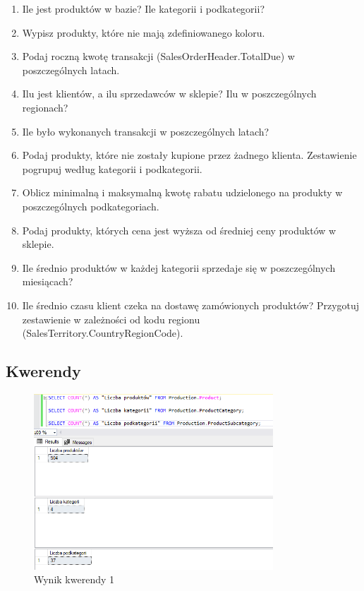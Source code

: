\documentclass[a4paper,12pt]{article}
\begin{document}
\begin{enumerate}
    \item Ile jest produktów w bazie? Ile kategorii i podkategorii?
    \item Wypisz produkty, które nie mają zdefiniowanego koloru.
    \item Podaj roczną kwotę transakcji (SalesOrderHeader.TotalDue) w poszczególnych latach.
    \item Ilu jest klientów, a ilu sprzedawców w sklepie? Ilu w poszczególnych regionach?
    \item Ile było wykonanych transakcji w poszczególnych latach?
    \item Podaj produkty, które nie zostały kupione przez żadnego klienta. Zestawienie pogrupuj według kategorii i podkategorii.
    \item Oblicz minimalną i maksymalną kwotę rabatu udzielonego na produkty w poszczególnych podkategoriach.
    \item Podaj produkty, których cena jest wyższa od średniej ceny produktów w sklepie.
    \item Ile średnio produktów w każdej kategorii sprzedaje się w poszczególnych miesiącach?
    \item Ile średnio czasu klient czeka na dostawę zamówionych produktów? Przygotuj zestawienie w zależności od kodu regionu (SalesTerritory.CountryRegionCode).
\end{enumerate}

\subsection{Kwerendy}

\begin{figure}[H]
    \centering
    \includegraphics[width=0.8\textwidth]{images/01.png}
    \caption{Wynik kwerendy 1}
    \end{figure}
\end{document}
